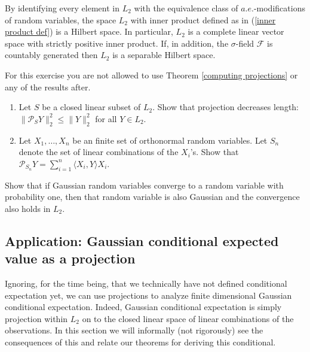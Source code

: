 \begin{theorem}
By identifying every element in $L_2$ with the equivalence class of  $a.e.$-modifications of random variables, the space $L_2$ with inner product defined as in (\ref{inner product def}) is a Hilbert space. 
In particular, $L_2$ is a complete linear vector space with strictly positive inner product. 
If, in addition, the $\sigma$-field $\mathcal F$ is countably generated then $L_2$ is a separable Hilbert space.
\end{theorem}


\begin{exercise}
\label{finite projection}
For this exercise you are not allowed to use Theorem \ref{computing projections} or any of the results after.
\begin{enumerate}
\item Let $S$ be a closed linear subset of $L_2$. Show that projection decreases length:  $\|\mathcal P_S Y \|^2_2 \leq  \| Y \|_2^2$ for all $Y\in L_2$.
\item Let $X_1, \ldots, X_n$ be an finite set of orthonormal random variables. Let $S_n$ denote the set of linear combinations of the $X_i$'s. Show that $\mathcal P_{S_n} Y = \sum_{i=1}^n \langle X_i, Y\rangle X_i$.
\end{enumerate}
\end{exercise}


\begin{exercise}
Show that if Gaussian random variables converge to a random variable with probability one, then that random variable is also Gaussian and the convergence also holds in $L_2$.
\end{exercise}


\subsection{Application: Gaussian conditional expected value as a projection}

Ignoring, for the time being, that we technically have not defined conditional expectation yet, we can use projections to analyze finite dimensional Gaussian conditional expectation. Indeed, Gaussian conditional expectation is simply projection within $L_2$ on to the closed linear space of linear combinations of the observations. In this section we will informally (not rigorously) see the consequences of this and relate our theorems for deriving this conditional. 

